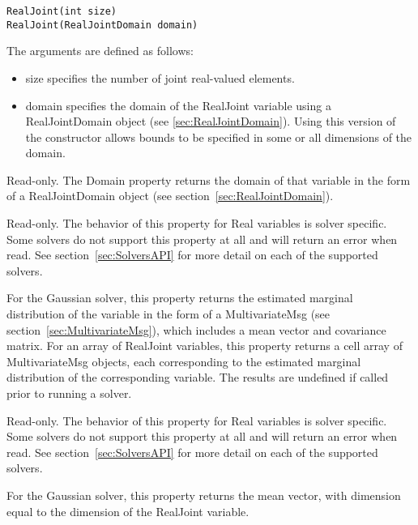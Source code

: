\ifjava
\begin{lstlisting}
RealJoint(int size)
RealJoint(RealJointDomain domain)
\end{lstlisting}

The arguments are defined as follows:

\begin{itemize}
\item size specifies the number of joint real-valued elements.
\item domain specifies the domain of the RealJoint variable using a RealJointDomain object (see \ref{sec:RealJointDomain}).  Using this version of the constructor allows bounds to be specified in some or all dimensions of the domain.
\end{itemize}
\fi


\label{sec:RealJoint.Domain}

Read-only.  The Domain property returns the domain of that variable in the form of a RealJointDomain object (see section~\ref{sec:RealJointDomain}).

\label{sec:RealJoint.Belief}

Read-only.  The behavior of this property for Real variables is solver specific.  Some solvers do not support this property at all and will return an error when read.  See section~\ref{sec:SolversAPI} for more detail on each of the supported solvers.

For the Gaussian solver, this property returns the estimated marginal distribution of the variable in the form of a MultivariateMsg (see section~\ref{sec:MultivariateMsg}), which includes a mean vector and covariance matrix.  \ifmatlab For an array of RealJoint variables, this property returns a cell array of MultivariateMsg objects, each corresponding to the estimated marginal distribution of the corresponding variable. \fi The results are undefined if called prior to running a solver.

\label{sec:RealJoint.Value}

Read-only.  The behavior of this property for Real variables is solver specific.  Some solvers do not support this property at all and will return an error when read.  See section~\ref{sec:SolversAPI} for more detail on each of the supported solvers.

For the Gaussian solver, this property returns the mean vector, with dimension equal to the dimension of the RealJoint variable.

